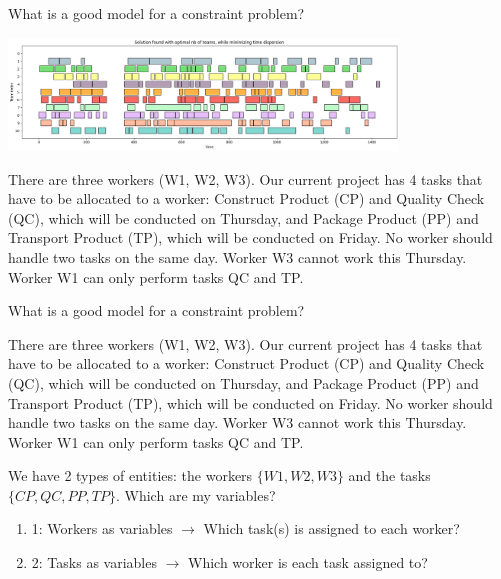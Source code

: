 \documentclass{cons-beamer}
\begin{document}
\begin{frame}{What is a good model for a constraint problem?}
  \begin{example}
    \begin{center}
      \includegraphics[height=30mm]{images/task_allocation.png}
    \end{center}

    There are three workers (W1, W2, W3). Our current project has 4 tasks that have to be allocated to a worker: Construct Product (CP) and Quality Check (QC), which will be conducted on Thursday, and Package Product (PP) and Transport Product (TP), which will be conducted on Friday. No worker should handle two tasks on the same day.  Worker W3 cannot work this Thursday. Worker W1 can only perform tasks QC and TP.
  \end{example}
\end{frame}

\begin{frame}{What is a good model for a constraint problem?}
    \begin{example}
      There are three workers (W1, W2, W3). Our current project has 4 tasks that have to be allocated to a worker: Construct Product (CP) and Quality Check (QC), which will be conducted on Thursday, and Package Product (PP) and Transport Product (TP), which will be conducted on Friday. No worker should handle two tasks on the same day.  Worker W3 cannot work this Thursday. Worker W1 can only perform tasks QC and TP.
    \end{example}

    We have 2 types of entities: the workers $\{W1, W2, W3\}$ and the tasks $\{CP, QC, PP, TP\}$. Which are my variables?\vfill
    \begin{enumerate}
      \item {} 1: Workers as variables $\xrightarrow{}$ Which task(s) is assigned to each worker?\vfill
      \item {} 2: Tasks as variables $\xrightarrow{}$ Which worker is each task assigned to?\vfill
    \end{enumerate}
\end{frame}
\end{document}
